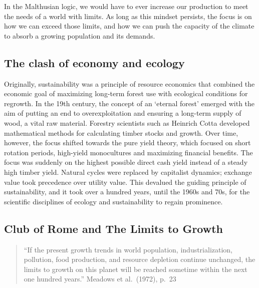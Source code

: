 \documentclass[
  a4paper,
  openany]{book}
\begin{document}
In the Malthusian logic, we would have to ever increase our production
to meet the needs of a world with limits. As long as this mindset
persists, the focus is on how we can exceed those limits, and how we can
push the capacity of the climate to absorb a growing population and its
demands.

\subsection{The clash of economy and
ecology}\label{the-clash-of-economy-and-ecology}

Originally, sustainability was a principle of resource economics that
combined the economic goal of maximizing long-term forest use with
ecological conditions for regrowth. In the 19th century, the concept of
an `eternal forest' emerged with the aim of putting an end to
overexploitation and ensuring a long-term supply of wood, a vital raw
material. Forestry scientists such as Heinrich Cotta developed
mathematical methods for calculating timber stocks and growth. Over
time, however, the focus shifted towards the pure yield theory, which
focused on short rotation periods, high-yield monocultures and
maximizing financial benefits. The focus was suddenly on the highest
possible direct cash yield instead of a steady high timber yield.
Natural cycles were replaced by capitalist dynamics; exchange value took
precedence over utility value. This devalued the guiding principle of
sustainability, and it took over a hundred years, until the 1960s and
70s, for the scientific disciplines of ecology and sustainability to
regain prominence.

\subsection{Club of Rome and The Limits to
Growth}\label{club-of-rome-and-the-limits-to-growth}

\begin{quote}
``If the present growth trends in world population, industrialization,
pollution, food production, and resource depletion continue unchanged,
the limits to growth on this planet will be reached sometime within the
next one hundred years.'' Meadows et al.~(1972), p.~23
\end{quote}
\end{document}
